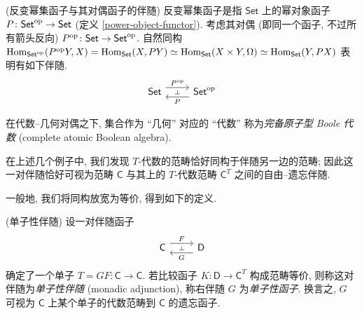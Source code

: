 \begin{example}
	{(反变幂集函子与其对偶函子的伴随)}
	反变幂集函子是指 $\mathsf {Set}$ 上的幂对象函子 $P\colon \mathsf {Set}^{\text{op}} \to \mathsf {Set}$ (定义 \ref{power-object-functor}). 考虑其对偶 (即同一个函子, 不过所有箭头反向) $P^{\text{op}}\colon \mathsf {Set}\to\mathsf {Set}^{\text{op}}$. 自然同构 $\operatorname{Hom}_{\mathsf {Set}^{\text{op}}}(P^{\text{op}} Y,X) = \operatorname{Hom}_{\mathsf {Set}}(X,PY)\simeq \operatorname{Hom}_{\mathsf {Set}}(X\times Y,\Omega) \simeq \operatorname{Hom}_{\mathsf {Set}}(Y,PX)$ 表明有如下伴随.
	\[\begin{tikzcd}[ampersand replacement=\&]
		{\mathsf {Set}} \& {\mathsf {Set}^\op}
		\arrow[""{name=0, anchor=center, inner sep=0}, "{P^\op}", shift left=2, from=1-1, to=1-2]
		\arrow[""{name=1, anchor=center, inner sep=0}, "P", shift left=2, from=1-2, to=1-1]
		\arrow["\dashv"{anchor=center, rotate=-90}, draw=none, from=0, to=1]
	\end{tikzcd}\]
	
	在代数--几何对偶之下, 集合作为 ``几何'' 对应的 ``代数'' 称为\emph{完备原子型 Boole 代数} (complete atomic Boolean algebra).
	\todo{}
\end{example}

在上述几个例子中, 我们发现 $T$-代数的范畴恰好同构于伴随另一边的范畴; 因此这一对伴随恰好可视为范畴 $\mathsf C$ 与其上的 $T$-代数范畴 $\mathsf C^T$ 之间的自由--遗忘伴随.

%	

一般地, 我们将同构放宽为等价, 得到如下的定义.

\begin{definition}
    {(单子性伴随)}
    设一对伴随函子
    $$
    \begin{tikzcd}[ampersand replacement=\&]
    	{\mathsf C} \& {\mathsf D}
    	\arrow[""{name=0, anchor=center, inner sep=0}, "G", shift left=2, from=1-2, to=1-1]
    	\arrow[""{name=1, anchor=center, inner sep=0}, "F", shift left=2, from=1-1, to=1-2]
    	\arrow["\dashv"{anchor=center, rotate=-90}, draw=none, from=1, to=0]
    \end{tikzcd}
    $$
    确定了一个单子 $T = GF \colon \mathsf C \to \mathsf C$.
    若比较函子 $K\colon \mathsf D\to\mathsf C^T$ 构成范畴等价, 则称这对伴随为\emph{单子性伴随} (monadic adjunction), 称右伴随 $G$ 为\emph{单子性函子}. 换言之, $G$ 可视为 $\mathsf C$ 上某个单子的代数范畴到 $\mathsf C$ 的遗忘函子.
\end{definition}


